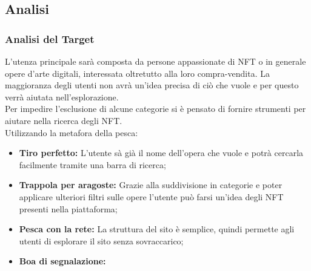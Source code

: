 \documentclass[10pt]{article}
\begin{document}
\subsection{Analisi}
\subsubsection{Analisi del Target}
L'utenza principale sarà composta da persone appassionate di NFT o in generale opere d'arte digitali, interessata oltretutto alla loro compra-vendita. La maggioranza degli utenti non avrà un'idea precisa di ciò che vuole e per questo verrà aiutata nell'esplorazione.\\
Per impedire l'esclusione di alcune categorie si è pensato di fornire strumenti per aiutare nella ricerca degli NFT.\\
Utilizzando la metafora della pesca:
\begin{itemize}
    \item \textbf{Tiro perfetto:} L'utente sà già il nome dell'opera che vuole e potrà cercarla facilmente tramite una barra di ricerca;
    \item \textbf{Trappola per aragoste:} Grazie alla suddivisione in categorie e poter applicare ulteriori filtri sulle opere l'utente può farsi un'idea degli NFT presenti nella piattaforma;
    \item \textbf{Pesca con la rete:} La struttura del sito è semplice, quindi permette agli utenti di esplorare il sito senza sovraccarico;
    \item \textbf{Boa di segnalazione:}
\end{itemize}
\end{document}
